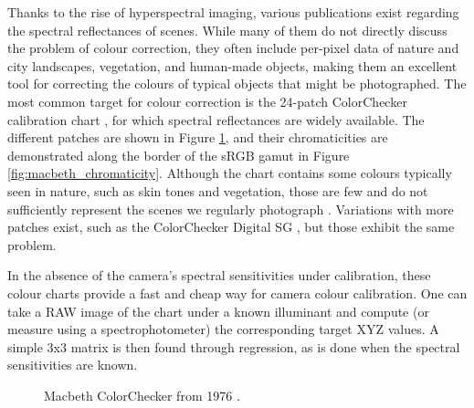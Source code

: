 Thanks to the rise of hyperspectral imaging, various publications exist regarding the spectral reflectances of scenes. While many of them do not directly discuss the problem of colour correction, they often include per-pixel data of nature and city landscapes, vegetation, and human-made objects, making them an excellent tool for correcting the colours of typical objects that might be photographed. The most common target for colour correction is the 24-patch ColorChecker calibration chart \cite{mccamy1976color}, for which spectral reflectances are widely available. The different patches are shown in Figure \ref{fig:macbeth}, and their chromaticities are demonstrated along the border of the sRGB gamut in Figure \ref{fig:macbeth_chromaticity}. Although the chart contains some colours typically seen in nature, such as skin tones and vegetation, those are few and do not sufficiently represent the scenes we regularly photograph \cite{wueller2009situ}. Variations with more patches exist, such as the ColorChecker Digital SG \cite{calibrite}, but those exhibit the same problem. 

In the absence of the camera's spectral sensitivities under calibration, these colour charts provide a fast and cheap way for camera colour calibration. One can take a RAW image of the chart under a known illuminant and compute (or measure using a spectrophotometer) the corresponding target XYZ values. A simple 3x3 matrix is then found through regression, as is done when the spectral sensitivities are known.

\begin{figure}
    \centering
    \caption{Macbeth ColorChecker from 1976 \cite{mccamy1976color}.}
    \label{fig:macbeth}
\end{figure}

